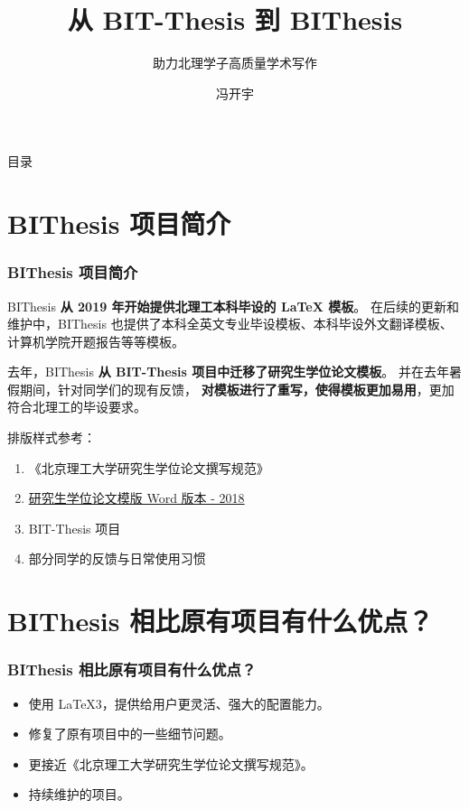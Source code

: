 \documentclass[
  aspectratio=169,
  presentation,
  titlegraphic=./images/bit.png,
  framelogo=./images/bit.png
]{bitbeamer}
\title{从 BIT-Thesis 到 BIThesis}
\subtitle{助力北理学子高质量学术写作}
\author{冯开宇}
\institute{北京理工大学}
\date{\zhdate{2023/10/12}}
\begin{document}
\frame{\titlepage}

%
%
\begin{frame}{目录}
  \tableofcontents[hideallsubsections]
\end{frame}


\section{BIThesis 项目简介}

\begin{frame}[t]
  \frametitle{BIThesis 项目简介}
  BIThesis \textbf{从 2019 年开始提供北理工本科毕设的 LaTeX 模板}。
  在后续的更新和维护中，BIThesis 也提供了本科全英文专业毕设模板、本科毕设外文翻译模板、计算机学院开题报告等等模板。

  去年，BIThesis \textbf{从 BIT-Thesis 项目中迁移了研究生学位论文模板}。
  并在去年暑假期间，针对同学们的现有反馈，
  \textbf{对模板进行了重写，使得模板更加易用}，更加符合北理工的毕设要求。

  \vspace{0.5cm}

  排版样式参考：
  \begin{enumerate}
    \item 《北京理工大学研究生学位论文撰写规范》
    \item \href{https://grd.bit.edu.cn/xwgz/xwgz2/wjxz_xwgz/b119746.htm}{研究生学位论文模版 Word 版本 - 2018}
    \item BIT-Thesis 项目
    \item 部分同学的反馈与日常使用习惯
  \end{enumerate}
\end{frame}




%
\section{BIThesis 相比原有项目有什么优点？}    %

\begin{frame}[t] %
  \frametitle{BIThesis 相比原有项目有什么优点？}

  \begin{itemize}
    \item 使用 LaTeX3，提供给用户更灵活、强大的配置能力。
    \item 修复了原有项目中的一些细节问题。
    \item 更接近《北京理工大学研究生学位论文撰写规范》。
    \item 持续维护的项目。
  \end{itemize}
\end{frame}
\end{document}

